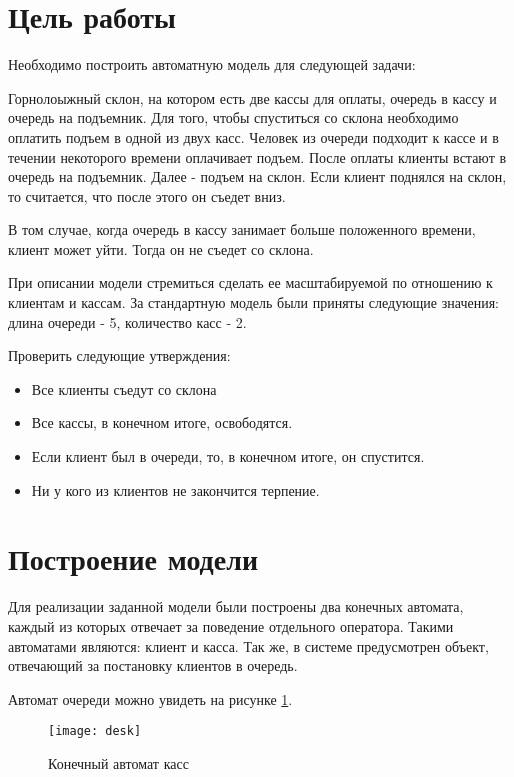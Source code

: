 







\section{Цель работы}
Необходимо построить автоматную модель для следующей задачи:

Горнолоыжный склон, на котором есть две кассы для оплаты, очередь в кассу и очередь на подъемник. Для того, чтобы спуститься со склона необходимо оплатить подъем в одной из двух касс. Человек из очереди подходит к кассе и в течении некоторого времени оплачивает подъем. После оплаты клиенты встают в очередь на подъемник. Далее - подъем на склон. Если клиент поднялся на склон, то считается, что после этого он съедет вниз.

В том случае, когда очередь в кассу занимает больше положенного времени, клиент может уйти. Тогда он не съедет со склона. 

При описании модели стремиться сделать ее масштабируемой по отношению к клиентам и кассам. За стандартную модель были приняты следующие значения: длина очереди - 5, количество касс - 2. 

Проверить следующие утверждения:
\begin{itemize}
\item Все клиенты съедут со склона
\item Все кассы, в конечном итоге, освободятся.
\item Если клиент был в очереди, то, в конечном итоге, он спустится.
\item Ни у кого из клиентов не закончится терпение.
\end{itemize}

\section{Построение модели}
Для реализации заданной модели были построены два конечных автомата, каждый из которых отвечает за поведение отдельного оператора. Такими автоматами являются: клиент и касса. Так же, в системе предусмотрен объект, отвечающий за постановку клиентов в очередь. 

Автомат очереди можно увидеть на рисунке \ref{pic:desk}.
\begin{figure}[H]
	\begin{center}
		\texttt{[image: desk]}
		\caption{Конечный автомат касс} 
		\label{pic:desk} %
	\end{center}
\end{figure}

